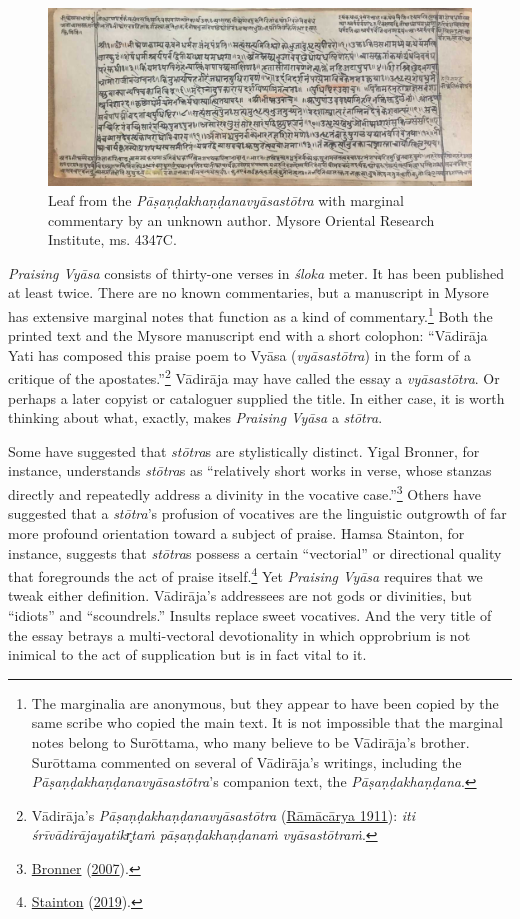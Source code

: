 \begin{figure}[ht!]\label{fig1}\centering

\includegraphics[width=\textwidth]{images/figure-01.jpg}
\caption{Leaf from the \emph{{Pāṣaṇḍakhaṇḍanavyāsastōtra}} with marginal commentary by an unknown author. Mysore Oriental Research Institute, ms. 4347C.}

\end{figure}


\emph{Praising Vyāsa} consists of thirty-one verses in \emph{śloka} meter. It has been published at least twice. There are no known commentaries, but a manuscript in Mysore has extensive marginal notes that function as a kind of commentary.\footnote{%
The marginalia are anonymous, but they appear to have been copied by the same scribe who copied the main text. It is not impossible that the marginal notes belong to Surōttama, who many believe to be Vādirāja’s brother. Surōttama commented on several of Vādirāja’s writings, including the \emph{{Pāṣaṇḍakhaṇḍanavyāsastōtra}}’s companion text, the \emph{{Pāṣaṇḍakhaṇḍana}}.
}
 Both the printed text and the Mysore manuscript end with a short colophon: “Vādirāja Yati has composed this praise poem to Vyāsa (\emph{vyāsastōtra}) in the form of a critique of the apostates.”\footnote{%
Vādirāja’s \emph{{Pāṣaṇḍakhaṇḍanavyāsastōtra}} (\hyperref[VP]{Rāmācārya 1911}): \emph{iti śrīvādirājayatikr̥taṁ pāṣaṇḍakhaṇḍanaṁ vyāsastōtraṁ}.
}
 Vādirāja may have called the essay a \emph{vyāsastōtra}. Or perhaps a later copyist or cataloguer supplied the title. In either case, it is worth thinking about what, exactly, makes \emph{Praising Vyāsa} a \emph{stōtra}. 


Some have suggested that \emph{stōtra}s are stylistically distinct. Yigal Bronner, for instance, understands \emph{stōtra}s as “relatively short works in verse, whose stanzas directly and repeatedly address a divinity in the vocative case.”\footnote{%
\hyperref[Bronner2007]{Bronner} (\hyperref[Bronner2007]{2007}).
}
 Others have suggested that a \emph{stōtra}’s profusion of vocatives are the linguistic outgrowth of far more profound orientation toward a subject of praise. Hamsa Stainton, for instance, suggests that \emph{stōtra}s possess a certain “vectorial” or directional quality that foregrounds the act of praise itself.\footnote{%
\hyperref[Stainton2019]{Stainton} (\hyperref[Stainton2019]{2019}).
}
 Yet \emph{Praising Vyāsa} requires that we tweak either definition. Vādirāja’s addressees are not gods or divinities, but “idiots” and “scoundrels.” Insults replace sweet vocatives. And the very title of the essay betrays a multi-vectoral devotionality in which opprobrium is not inimical to the act of supplication but is in fact vital to it.


